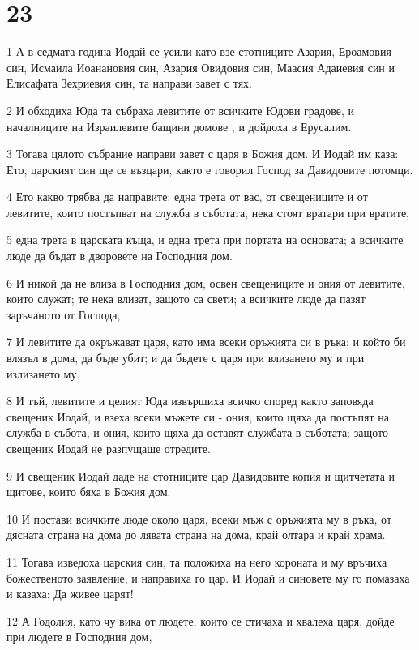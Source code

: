 \chapter{23}

\par 1 А в седмата година Иодай се усили като взе стотниците Азария, Ероамовия син, Исмаила Иоанановия син, Азария Овидовия син, Маасия Адаиевия син и Елисафата Зехриевия син, та направи завет с тях.
\par 2 И обходиха Юда та събраха левитите от всичките Юдови градове, и началниците на Израилевите бащини домове , и дойдоха в Ерусалим.
\par 3 Тогава цялото събрание направи завет с царя в Божия дом. И Иодай им каза: Ето, царският син ще се възцари, както е говорил Господ за Давидовите потомци.
\par 4 Ето какво трябва да направите: една трета от вас, от свещениците и от левитите, които постъпват на служба в съботата, нека стоят вратари при вратите,
\par 5 една трета в царската къща, и една трета при портата на основата; а всичките люде да бъдат в дворовете на Господния дом.
\par 6 И никой да не влиза в Господния дом, освен свещениците и ония от левитите, които служат; те нека влизат, защото са свети; а всичките люде да пазят заръчаното от Господа,
\par 7 И левитите да окръжават царя, като има всеки оръжията си в ръка; и който би влязъл в дома, да бъде убит; и да бъдете с царя при влизането му и при излизането му.
\par 8 И тъй, левитите и целият Юда извършиха всичко според както заповяда свещеник Иодай, и взеха всеки мъжете си - ония, които щяха да постъпят на служба в събота, и ония, които щяха да оставят службата в съботата; защото свещеник Иодай не разпущаше отредите.
\par 9 И свещеник Иодай даде на стотниците цар Давидовите копия и щитчетата и щитове, които бяха в Божия дом.
\par 10 И постави всичките люде около царя, всеки мъж с оръжията му в ръка, от дясната страна на дома до лявата страна на дома, край олтара и край храма.
\par 11 Тогава изведоха царския син, та положиха на него короната и му връчиха божественото заявление, и направиха го цар. И Иодай и синовете му го помазаха и казаха: Да живее царят!
\par 12 А Годолия, като чу вика от людете, които се стичаха и хвалеха царя, дойде при людете в Господния дом,
